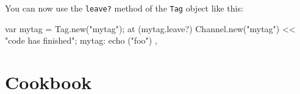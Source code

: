 You can now use the \lstinline{leave?} method of the \lstinline{Tag} object
like this:

\begin{urbiscript}
var mytag = Tag.new("mytag");
at (mytag.leave?)
  Channel.new("mytag") << "code has finished";
mytag: { echo ("foo") },
\end{urbiscript}

\section{Cookbook}



